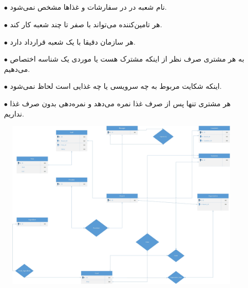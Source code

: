 \documentclass{article}
\begin{document}
\subsection{}
\begin{itemize}
    \item [$\bullet$] نام شعبه در در سفارشات و غذاها مشخص نمی‌شود.
    \item [$\bullet$] هر تامین‌کننده می‌تواند با صفر تا چند شعبه کار کند.
    \item [$\bullet$] هر سازمان دقیقا با یک شعبه قرارداد دارد.
    \item [$\bullet$] به هر مشتری صرف نظر از اینکه مشترک هست یا موردی یک شناسه اختصاص می‌دهیم.
    \item [$\bullet$] اینکه شکایت مربوط به چه سرویسی یا چه غذایی است لحاظ نمی‌شود.
    \item [$\bullet$] هر مشتری تنها پس از صرف غذا نمره می‌دهد و نمره‌دهی بدون صرف غذا نداریم.
\end{itemize}
\begin{figure}[H]
    \centering
    \includegraphics[width=1\textwidth]{figures/D1.jpg}
    \caption
	{
	}
    \label{fig:fig1}
\end{figure}
\end{document}
